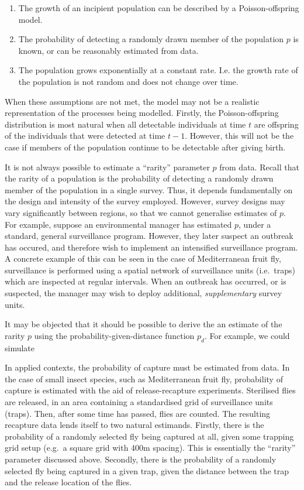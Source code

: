 \documentclass[
]{book}
\providecommand{\tightlist}{%
  \setlength{\itemsep}{0pt}\setlength{\parskip}{0pt}}
\begin{document}
\begin{enumerate}
\def\labelenumi{\arabic{enumi}.}
\tightlist
\item
  The growth of an incipient population can be described by a Poisson-offspring model.
\item
  The probability of detecting a randomly drawn member of the population \(p\) is known, or can be reasonably estimated from data.
\item
  The population grows exponentially at a constant rate. I.e. the growth rate of the population is not random and does not change over time.
\end{enumerate}

When these assumptions are not met, the model may not be a realistic representation of the processes being modelled. Firstly, the Poisson-offspring distribution is most natural when all detectable individuals at time \(t\) are offspring of the individuals that were detected at time \(t-1\). However, this will not be the case if members of the population continue to be detectable after giving birth.

It is not always possible to estimate a ``rarity'' parameter \(p\) from data. Recall that the rarity of a population is the probability of detecting a randomly drawn member of the population in a single survey. Thus, it depends fundamentally on the design and intensity of the survey employed. However, survey designs may vary significantly between regions, so that we cannot generalise estimates of \(p\). For example, suppose an environmental manager has estimated \(p\), under a standard, general surveillance program. However, they later suspect an outbreak has occured, and therefore wish to implement an intensified surveillance program. A concrete example of this can be seen in the case of Mediterranean fruit fly, surveillance is performed using a spatial network of surveillance units (i.e.~traps) which are inspected at regular intervals. When an outbreak has occurred, or is suspected, the manager may wish to deploy additional, \emph{supplementary} survey units.

It may be objected that it should be possible to derive the an estimate of the rarity \(p\) using the probability-given-distance function \(p_d\). For example, we could simulate

In applied contexts, the probability of capture must be estimated from data. In the case of small insect species, such as Mediterranean fruit fly, probability of capture is estimated with the aid of release-recapture experiments. Sterilised flies are released, in an area containing a standardised grid of surveillance units (traps). Then, after some time has passed, flies are counted. The resulting recapture data lends itself to two natural estimands. Firstly, there is the probability of a randomly selected fly being captured at all, given some trapping grid setup (e.g.~a square grid with 400m spacing). This is essentially the ``rarity'' parameter discussed above. Secondly, there is the probability of a randomly selected fly being captured in a given trap, given the distance between the trap and the release location of the flies.
\end{document}
